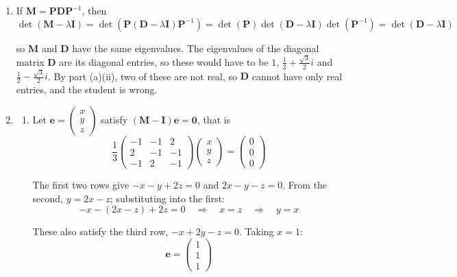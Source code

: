 \documentclass[leqno]{article}
\begin{document}
\begin{enumerate}[
  label=\textbf{\arabic*.},
  leftmargin=*,
  topsep=0pt,
  partopsep=0pt,
  parsep=0pt
]
\begin{djsSolution}
\begin{enumerate}[label=\textbf{(\alph*)}, start=1]
\begin{enumerate}[label=(\roman*), start=1]
The discriminant of \(\lambda^2-\lambda+1\) is \(b^2-4ac=1-4=-3<0\), so this quadratic has no real roots. Hence the only real root of the characteristic equation, and so the only real eigenvalue of \(\mathbf{M}\), is \(1\).
  \end{enumerate}

  \item If \(\mathbf{M}=\mathbf{P}\mathbf{D}\mathbf{P}^{-1}\), then
\[
\det(\mathbf{M}-\lambda\mathbf{I})=\det\left(\mathbf{P}(\mathbf{D}-\lambda\mathbf{I})\mathbf{P}^{-1}\right)=\det(\mathbf{P})\det(\mathbf{D}-\lambda\mathbf{I})\det(\mathbf{P}^{-1})=\det(\mathbf{D}-\lambda\mathbf{I})
\]

so \(\mathbf{M}\) and \(\mathbf{D}\) have the same eigenvalues. The eigenvalues of the diagonal matrix \(\mathbf{D}\) are its diagonal entries, so these would have to be \(1\), \(\frac{1}{2}+\frac{\sqrt{3}}{2}i\) and \(\frac{1}{2}-\frac{\sqrt{3}}{2}i\). By part (a)(ii), two of these are not real, so \(\mathbf{D}\) cannot have only real entries, and the student is wrong.

  \item
  \begin{enumerate}[label=(\roman*), start=1]
    \item Let \(\mathbf{e}=\begin{pmatrix}x\\y\\z\end{pmatrix}\) satisfy \((\mathbf{M}-\mathbf{I})\mathbf{e}=\mathbf{0}\), that is
\[
\dfrac{1}{3}\begin{pmatrix} -1 & -1 & 2 \\ 2 & -1 & -1 \\ -1 & 2 & -1 \end{pmatrix}\begin{pmatrix}x\\y\\z\end{pmatrix}=\begin{pmatrix}0\\0\\0\end{pmatrix}
\]

The first two rows give \(-x-y+2z=0\) and \(2x-y-z=0\). From the second, \(y=2x-z\); substituting into the first:
\[
-x-(2x-z)+2z=0\quad\Longrightarrow\quad x=z\quad\Longrightarrow\quad y=x
\]

These also satisfy the third row, \(-x+2y-z=0\). Taking \(x=1\):
\[
\mathbf{e}=\begin{pmatrix}1\\1\\1\end{pmatrix}
\]


\end{enumerate}
\end{enumerate}
\end{djsSolution}
\end{enumerate}
\end{document}

